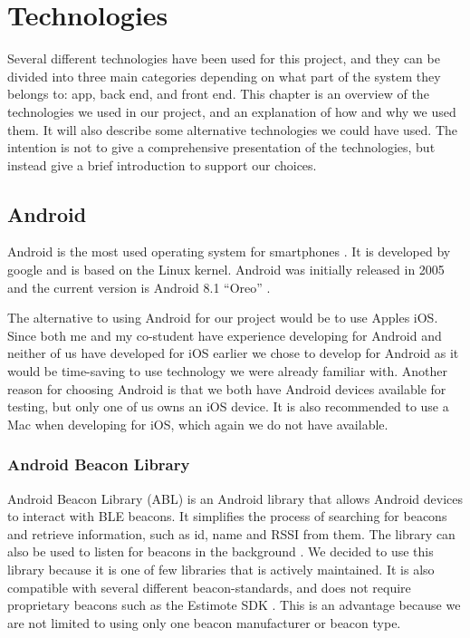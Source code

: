 \documentclass[../Main/thesis.tex]{subfiles}
\begin{document}
\chapter{Technologies}
\label{ch:technologies}

Several different technologies have been used for this project, and they can be divided into three main categories depending on what part of the system they belongs to: app, back end, and front end.
This chapter is an overview of the technologies we used in our project, and an explanation of how and why we used them.
It will also describe some alternative technologies we could have used.
The intention is not to give a comprehensive presentation of the technologies, but instead give a brief introduction to support our choices.

\section{Android}
Android is the most used operating system for smartphones \citep{osmarketshare}. 
It is developed by google and is based on the Linux kernel.
Android was initially released in 2005 \citep{Morrill2008a} and the current version is Android 8.1 ``Oreo'' \citep{Burke2017a}.

The alternative to using Android for our project would be to use Apples iOS.
Since both me and my co-student have experience developing for Android and neither of us have developed for iOS earlier we chose to develop for Android as it would be time-saving to use technology we were already familiar with.
Another reason for choosing Android is that we both have Android devices available for testing, but only one of us owns an iOS device.
It is also recommended to use a Mac when developing for iOS, which again we do not have available.

\subsection{Android Beacon Library}
Android Beacon Library (ABL) is an Android library that allows Android devices to interact with BLE beacons. 
It simplifies the process of searching for beacons and retrieve information, such as id, name and RSSI from them.
The library can also be used to listen for beacons in the background \citep{RadiusNetwork2015}.
We decided to use this library because it is one of few libraries that is actively maintained.
It is also compatible with several different beacon-standards, and does not require proprietary beacons such as the Estimote SDK \citep{Estimote2017}.
This is an advantage because we are not limited to using only one beacon manufacturer or beacon type.
\end{document}
